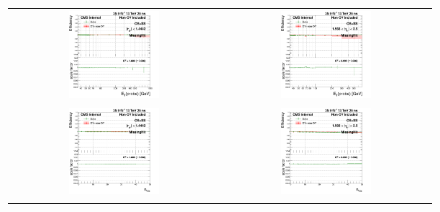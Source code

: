 \begin{figure}[bh]
  \begin{center}
    \begin{tabular}{cc}
      \includegraphics[width=0.45\textwidth]{figures/Zprime/2016/ScaleFactor/SameSign/N_1_eff/g_compare_cut_Et_Barrel_ea_ta_inc_AS_N_1_MissHit_PUW.png} &
      \includegraphics[width=0.45\textwidth]{figures/Zprime/2016/ScaleFactor/SameSign/N_1_eff/g_compare_cut_Et_Endcap_ea_ta_inc_AS_N_1_MissHit_PUW.png} \\
      \includegraphics[width=0.45\textwidth]{figures/Zprime/2016/ScaleFactor/SameSign/N_1_eff/g_compare_cut_nVtx_Barrel_ea_ta_inc_AS_N_1_MissHit_PUW.png} &
      \includegraphics[width=0.45\textwidth]{figures/Zprime/2016/ScaleFactor/SameSign/N_1_eff/g_compare_cut_nVtx_Endcap_ea_ta_inc_AS_N_1_MissHit_PUW.png} \\

\end{tabular}
\end{center}
\end{figure}
